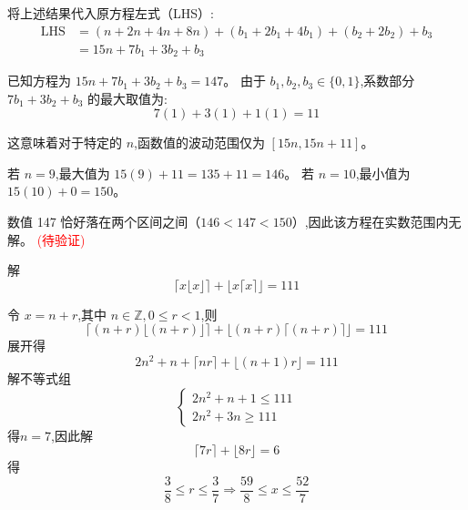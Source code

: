 \begin{questions}
\begin{solution}
    将上述结果代入原方程左式（LHS）:
    \begin{align}
    \text{LHS} &= (n + 2n + 4n + 8n) + (b_1 + 2b_1 + 4b_1) + (b_2 + 2b_2) + b_3 \\
    &= 15n + 7b_1 + 3b_2 + b_3
    \end{align}

    已知方程为 $15n + 7b_1 + 3b_2 + b_3 = 147$。
    由于 $b_1, b_2, b_3 \in \{0, 1\}$,系数部分 $7b_1 + 3b_2 + b_3$ 的最大取值为:
    \[ 7(1) + 3(1) + 1(1) = 11 \]
    
    这意味着对于特定的 $n$,函数值的波动范围仅为 $[15n, 15n + 11]$。

    若 $n = 9$,最大值为 $15(9) + 11 = 135 + 11 = 146$。
    若 $n = 10$,最小值为 $15(10) + 0 = 150$。
    
    数值 147 恰好落在两个区间之间（$146 < 147 < 150$）,因此该方程在实数范围内无解。
    \textcolor{red}{(待验证)}
\end{solution}

    \question 解
    \[
    \lceil x \lfloor x \rfloor \rceil + \lfloor x \lceil x \rceil \rfloor = 111
    \]
    \begin{solution}
        令 $x = n + r$,其中 $n\in \mathbb{Z}, 0 \le r < 1$,则
        \[
        \lceil (n+r) \lfloor(n+r) \rfloor\rceil + \lfloor (n+r)\lceil(n+r)\rceil \rfloor = 111
        \]
        展开得
        \[
        2n^2 +n + \lceil nr \rceil + \lfloor (n+1)r \rfloor = 111
        \]
        解不等式组
        \[
        \begin{cases}
        2n^2+n+1 \le 111 \\
        2n^2+3n \ge 111
        \end{cases}
        \]
        得$n=7$,因此解
        \[
        \lceil 7r \rceil + \lfloor 8r \rfloor =6
        \]
        得
        \[
        \frac{3}{8} \le r \le \frac{3}{7} \Rightarrow \frac{59}{8} \le x \le \frac{52}{7}
        \]
    \end{solution}

    \question 
\end{questions}
